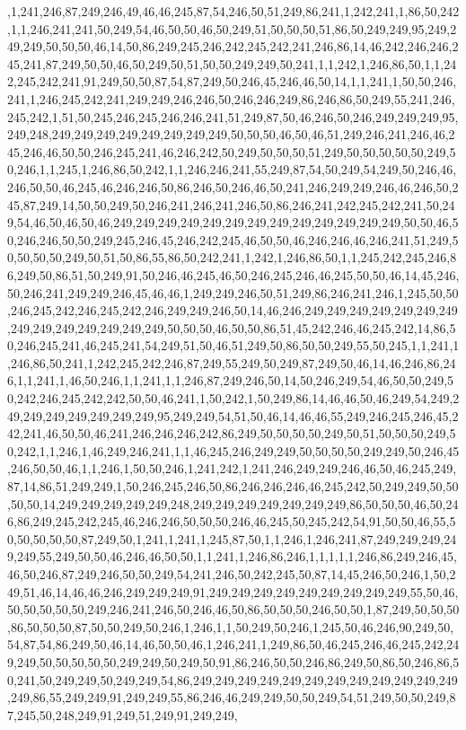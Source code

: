 ,1,241,246,87,249,246,49,46,46,245,87,54,246,50,51,249,86,241,1,242,241,1,86,50,242,1,1,246,241,241,50,249,54,46,50,50,46,50,249,51,50,50,50,51,86,50,249,249,95,249,249,249,50,50,50,46,14,50,86,249,245,246,242,245,242,241,246,86,14,46,242,246,246,245,241,87,249,50,50,46,50,249,50,51,50,50,249,249,50,241,1,1,242,1,246,86,50,1,1,242,245,242,241,91,249,50,50,87,54,87,249,50,246,45,246,46,50,14,1,1,241,1,50,50,246,241,1,246,245,242,241,249,249,246,246,50,246,246,249,86,246,86,50,249,55,241,246,245,242,1,51,50,245,246,245,246,246,241,51,249,87,50,46,246,50,246,249,249,249,95,249,248,249,249,249,249,249,249,249,249,50,50,50,46,50,46,51,249,246,241,246,46,245,246,46,50,50,246,245,241,46,246,242,50,249,50,50,50,51,249,50,50,50,50,50,249,50,246,1,1,245,1,246,86,50,242,1,1,246,246,241,55,249,87,54,50,249,54,249,50,246,46,246,50,50,46,245,46,246,246,50,86,246,50,246,46,50,241,246,249,249,246,46,246,50,245,87,249,14,50,50,249,50,246,241,246,241,246,50,86,246,241,242,245,242,241,50,249,54,46,50,46,50,46,249,249,249,249,249,249,249,249,249,249,249,249,249,50,50,46,50,246,246,50,50,249,245,246,45,246,242,245,46,50,50,46,246,246,46,246,241,51,249,50,50,50,50,249,50,51,50,86,55,86,50,242,241,1,242,1,246,86,50,1,1,245,242,245,246,86,249,50,86,51,50,249,91,50,246,46,245,46,50,246,245,246,46,245,50,50,46,14,45,246,50,246,241,249,249,246,45,46,46,1,249,249,246,50,51,249,86,246,241,246,1,245,50,50,246,245,242,246,245,242,246,249,249,246,50,14,46,246,249,249,249,249,249,249,249,249,249,249,249,249,249,249,50,50,50,46,50,50,86,51,45,242,246,46,245,242,14,86,50,246,245,241,46,245,241,54,249,51,50,46,51,249,50,86,50,50,249,55,50,245,1,1,241,1,246,86,50,241,1,242,245,242,246,87,249,55,249,50,249,87,249,50,46,14,46,246,86,246,1,1,241,1,46,50,246,1,1,241,1,1,246,87,249,246,50,14,50,246,249,54,46,50,50,249,50,242,246,245,242,242,50,50,46,241,1,50,242,1,50,249,86,14,46,46,50,46,249,54,249,249,249,249,249,249,249,249,95,249,249,54,51,50,46,14,46,46,55,249,246,245,246,45,242,241,46,50,50,46,241,246,246,246,242,86,249,50,50,50,50,249,50,51,50,50,50,249,50,242,1,1,246,1,46,249,246,241,1,1,46,245,246,249,249,50,50,50,50,249,249,50,246,45,246,50,50,46,1,1,246,1,50,50,246,1,241,242,1,241,246,249,249,246,46,50,46,245,249,87,14,86,51,249,249,1,50,246,245,246,50,86,246,246,246,46,245,242,50,249,249,50,50,50,50,14,249,249,249,249,249,248,249,249,249,249,249,249,249,86,50,50,50,46,50,246,86,249,245,242,245,46,246,246,50,50,50,246,46,245,50,245,242,54,91,50,50,46,55,50,50,50,50,50,87,249,50,1,241,1,241,1,245,87,50,1,1,246,1,246,241,87,249,249,249,249,249,55,249,50,50,46,246,46,50,50,1,1,241,1,246,86,246,1,1,1,1,1,246,86,249,246,45,46,50,246,87,249,246,50,50,249,54,241,246,50,242,245,50,87,14,45,246,50,246,1,50,249,51,46,14,46,46,246,249,249,249,91,249,249,249,249,249,249,249,249,249,55,50,46,50,50,50,50,50,249,246,241,246,50,246,46,50,86,50,50,50,246,50,50,1,87,249,50,50,50,86,50,50,50,87,50,50,249,50,246,1,246,1,1,50,249,50,246,1,245,50,46,246,90,249,50,54,87,54,86,249,50,46,14,46,50,50,46,1,246,241,1,249,86,50,46,245,246,46,245,242,249,249,50,50,50,50,50,249,249,50,249,50,91,86,246,50,50,246,86,249,50,86,50,246,86,50,241,50,249,249,50,249,249,54,86,249,249,249,249,249,249,249,249,249,249,249,249,249,86,55,249,249,91,249,249,55,86,246,46,249,249,50,50,249,54,51,249,50,50,249,87,245,50,248,249,91,249,51,249,91,249,249,